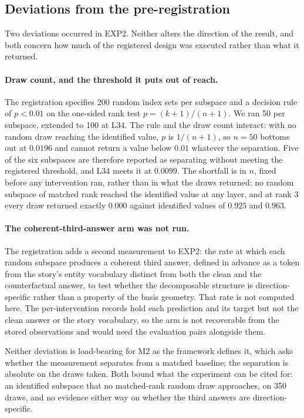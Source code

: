 \documentclass{article}
\begin{document}
\subsection*{Deviations from the pre-registration}

Two deviations occurred in EXP2. Neither alters the direction of the result, and both concern
how much of the registered design was executed rather than what it returned.

\paragraph{Draw count, and the threshold it puts out of reach.}
The registration specifies 200 random index sets per subspace and a decision rule of $p < 0.01$
on the one-sided rank test $p = (k+1)/(n+1)$. We ran 50 per subspace, extended to 100 at L34.
The rule and the draw count interact: with no random draw reaching the identified value, $p$ is
$1/(n+1)$, so $n = 50$ bottoms out at $0.0196$ and cannot return a value below $0.01$ whatever
the separation. Five of the six subspaces are therefore reported as separating without meeting
the registered threshold, and L34 meets it at $0.0099$. The shortfall is in $n$, fixed before
any intervention ran, rather than in what the draws returned: no random subspace of matched
rank reached the identified value at any layer, and at rank 3 every draw returned exactly
$0.000$ against identified values of $0.925$ and $0.963$.

\paragraph{The coherent-third-answer arm was not run.}
The registration adds a second measurement to EXP2: the rate at which each random subspace
produces a coherent third answer, defined in advance as a token from the story's entity
vocabulary distinct from both the clean and the counterfactual answer, to test whether the
decomposable structure is direction-specific rather than a property of the basis geometry. That
rate is not computed here. The per-intervention records hold each prediction and its target but
not the clean answer or the story vocabulary, so the arm is not recoverable from the stored
observations and would need the evaluation pairs alongside them.

Neither deviation is load-bearing for M2 as the framework defines it, which asks whether the
measurement separates from a matched baseline; the separation is absolute on the draws taken.
Both bound what the experiment can be cited for: an identified subspace that no matched-rank
random draw approaches, on 350 draws, and no evidence either way on whether the third answers
are direction-specific.
\end{document}
